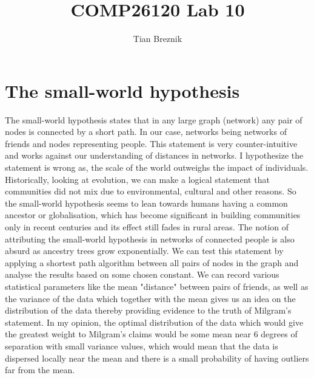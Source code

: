 \documentclass{article}
\title{COMP26120 Lab 10}
\author{Tian Breznik}
\begin{document}
\maketitle


\section{The small-world hypothesis}
\label{sec:small world}
The small-world hypothesis states that in any large graph (network) any pair of
nodes is connected by a short path. In our case, networks being networks of friends and nodes representing people.
This statement is very counter-intuitive and works against our understanding
of distances in networks. I hypothesize the statement is wrong as, the scale of
the world outweighs the impact of individuals. Historically, looking at evolution,
we can make a logical statement that communities did not mix due to environmental,
cultural and other reasons. So the small-world hypothesis seems to lean towards
humans having a common ancestor or globalisation, which has become significant in
building communities only in recent centuries and its effect still fades in rural areas.
The notion of attributing the small-world hypothesis in networks of connected people is
also absurd as ancestry trees grow exponentially.
We can test this statement by applying a shortest path algorithm between all pairs of nodes in the
graph and analyse the results based on some chosen constant. We can record various
statistical parameters like the mean "distance" between pairs of friends, as well
as the variance of the data which together with the mean gives us an idea on the
distribution of the data thereby providing evidence to the truth of Milgram's
statement. In my opinion, the optimal distribution of the data which would give
the greatest weight to Milgram's claims would be some mean near 6 degrees of
separation with small variance values, which would mean that the data is dispersed
locally near the mean and there is a small probability of having outliers far from
the mean.
\end{document}
